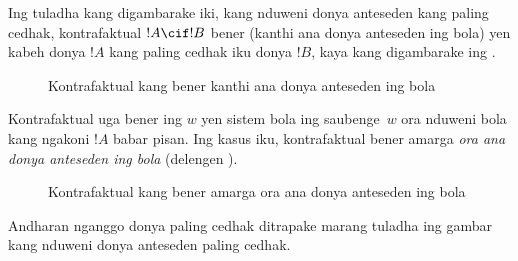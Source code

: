 \documentclass[../../../include/open-logic-section]{subfiles}
\begin{document}


Ing tuladha kang digambarake iki, kang nduweni donya anteseden
kang paling cedhak, kontrafaktual $!A \cif !B$ bener (kanthi
ana donya anteseden ing bola) yen kabeh donya $!A$ kang paling cedhak iku donya
$!B$, kaya kang digambarake ing .
\begin{figure}
\begin{center}
\caption{Kontrafaktual kang bener kanthi ana donya anteseden ing bola}
\end{center}
\end{figure}
Kontrafaktual uga bener ing $w$ yen sistem bola ing saubenge~$w$
ora nduweni bola kang ngakoni $!A$ babar pisan. Ing kasus iku,
kontrafaktual bener amarga \emph{ora ana donya anteseden ing bola} (delengen ).
\begin{figure}
\begin{center}
\caption{Kontrafaktual kang bener amarga ora ana donya anteseden ing bola}
\end{center}
\end{figure}
Andharan nganggo donya paling cedhak ditrapake marang tuladha ing gambar kang nduweni donya anteseden paling cedhak.
\end{document}
